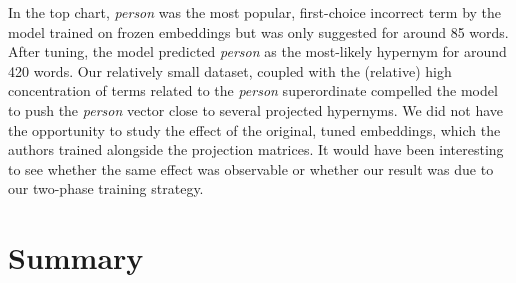 In the top chart, \textit{person} was the most popular, first-choice incorrect term by the model trained on frozen embeddings but was only suggested for around 85 words.  After tuning, the model predicted \textit{person} as the most-likely hypernym for around 420 words.  Our relatively small dataset, coupled with the (relative) high concentration of terms related to the \textit{person} superordinate compelled the model to push the \textit{person} vector close to several projected hypernyms.  We did not have the opportunity to study the effect of the original, tuned embeddings, which the authors trained alongside the projection matrices.  It would have been interesting to see whether the same effect was observable or whether our result was due to our two-phase training strategy.

\section{Summary}
